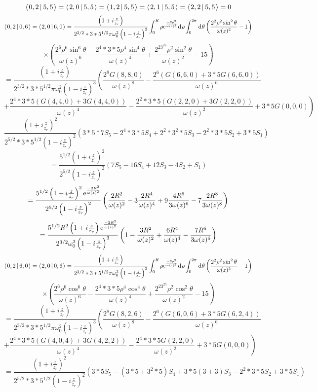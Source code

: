 \documentclass[11pt]{amsart}
\makeatletter
\newcommand{\e}{{\rm e}}				%
\newcommand{\msp}[1]{\mspace{#1mu}}		%
\newcommand{\0}{\varnothing}		%
\newcommand{\dd}{\msp{1} {\rm{d}} \msp{1}}	%
\newcommand{\brac}[2]{\left\langle\msp{2} #1\left\lvert \msp{3.5} #2 \right.\right\rangle}	%
\newcommand{\1}{!}
\newcommand{\2}{@}
\newcommand{\3}{\#}
\newcommand{\4}{\$}
\newcommand{\5}{\%}
\newcommand{\6}{$^\wedge$}
\newcommand{\7}{\&}
\newcommand{\8}{*}
\newcommand{\9}{(}
\makeatother
\begin{document}
\[
\brac{0,2}{5,5} = \brac{2,0}{5,5} = \brac{1,2}{5,5} = \brac{2,1}{5,5} = \brac{2,2}{5,5} = 0
\]
\[
\brac{0,2}{0,6} = \brac{2,0}{6,0} = \frac{\left(1+i\frac{z}{z_r}\right)}{2^{3/2}*3*5^{1/2}\pi\omega_0^2\left(1-i\frac{z}{z_r}\right)^3}\int_0^R \rho \e^{\frac{-2\rho^2}{\omega(z)^2}}\dd \rho \int_0^{2\pi}\dd \theta \left(\frac{2^2\rho^2\sin^2\theta}{\omega(z)^2}-1\right)
\]
\[
\times\left(\frac{2^6\rho^6\sin^6\theta}{\omega(z)^6}-\frac{2^4*3*5\rho^4\sin^4\theta}{\omega(z)^4}+\frac{2^23^25\rho^2\sin^2\theta}{\omega(z)^2}-15\right)
\]
\[
 =\frac{\left(1+i\frac{z}{z_r}\right)}{2^{3/2}*3*5^{1/2}\pi\omega_0^2\left(1-i\frac{z}{z_r}\right)^3}\left(\frac{2^8G(8,8,0)}{\omega(z)^8}-\frac{2^6\left(G(6,6,0)+3*5G(6,6,0)\right)}{\omega(z)^6}\right.
 \]
 \[
 \left.+\frac{2^4*3*5\left(G(4,4,0)+3G(4,4,0)\right)}{\omega(z)^4}-\frac{2^2*3*5\left(G(2,2,0)+3G(2,2,0)\right)}{\omega(z)^2}+3*5G(0,0,0)\right)
\]
\[
 \frac{\left(1+i\frac{z}{z_r}\right)^2}{2^{5/2}*3*5^{1/2}\left(1-i\frac{z}{z_r}\right)^2}\left(3*5*7S_5-2^4*3*5S_4+2^2*3^2*5S_3-2^2*3*5S_2+3*5S_1\right)
\]
\[
= \frac{5^{1/2}\left(1+i\frac{z}{z_r}\right)^2}{2^{5/2}\left(1-i\frac{z}{z_r}\right)^2}\left(7S_5-16S_4+12S_3-4S_2+S_1\right)
\]
\[
=\frac{5^{1/2}\left(1+i\frac{z}{z_r}\right)^2\e^{\frac{-2R^2}{\omega(z)^2}}}{2^{5/2}\left(1-i\frac{z}{z_r}\right)^2}\left(\frac{2R^2}{\omega(z)^2}-3\frac{2R^4}{\omega(z)^4}+9\frac{4R^6}{3\omega(z)^6}-7\frac{2R^8}{3\omega(z)^8}\right)
\]
\[
=\frac{5^{1/2}R^2\left(1+i\frac{z}{z_r}\right)\e^{\frac{-2R^2}{\omega(z)^2}}}{2^{3/2}\omega_0^2\left(1-i\frac{z}{z_r}\right)^3}\left(1-\frac{3R^2}{\omega(z)^2}+\frac{6R^4}{\omega(z)^4}-\frac{7R^6}{3\omega(z)^6}\right)
\]
\[
\brac{0,2}{6,0} = \brac{2,0}{0,6} = \frac{\left(1+i\frac{z}{z_r}\right)}{2^{3/2}*3*5^{1/2}\pi\omega_0^2\left(1-i\frac{z}{z_r}\right)^3}\int_0^R \rho \e^{\frac{-2\rho^2}{\omega(z)^2}}\dd \rho \int_0^{2\pi}\dd \theta \left(\frac{2^2\rho^2\sin^2\theta}{\omega(z)^2}-1\right)
\]
\[
\times\left(\frac{2^6\rho^6\cos^6\theta}{\omega(z)^6}-\frac{2^4*3*5\rho^4\cos^4\theta}{\omega(z)^4}+\frac{2^23^25\rho^2\cos^2\theta}{\omega(z)^2}-15\right)
\]
\[
= \frac{\left(1+i\frac{z}{z_r}\right)}{2^{3/2}*3*5^{1/2}\pi\omega_0^2\left(1-i\frac{z}{z_r}\right)^3}\left(\frac{2^8G(8,2,6)}{\omega(z)^8}-\frac{2^6\left(G(6,0,6)+3*5G(6,2,4)\right)}{\omega(z)^6}\right.
 \]
 \[
 \left.+\frac{2^4*3*5\left(G(4,0,4)+3G(4,2,2)\right)}{\omega(z)^4}-\frac{2^4*3*5G(2,2,0)}{\omega(z)^2}+3*5G(0,0,0)\right)
\]
\[
=\frac{\left(1+i\frac{z}{z_r}\right)^2}{2^{5/2}*3*5^{1/2}\left(1-i\frac{z}{z_r}\right)^2}\left(3*5S_5-\left(3*5+3^2*5\right)S_4+3*5\left(3+3\right)S_3-2^2*3*5S_2+3*5S_1\right)
\]
\end{document}
